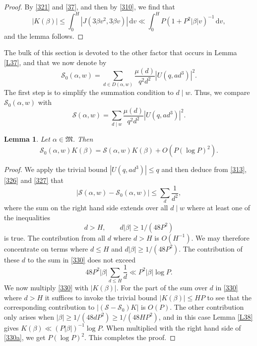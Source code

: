 \documentclass[reqno]{amsart}
\newcommand\dd{{\mathrm d}}
\newtheorem{lemma}[thm]{Lemma}
\numberwithin{equation}{section}
\begin{document}
\begin{proof} By \eqref{321} and \eqref{37}, and then by \eqref{310}, we find that
$$ |K(\beta)| \le \int_0^H|J(3\beta v^2, 3\beta v)|\,\dd v \ll \int_0^H P(1+P^2|\beta|v)^{-1}  \,\dd v, $$
and the lemma follows.
 \end{proof}
 
The bulk of this section is devoted to the other factor that occurs in Lemma \ref{L37}, and that we now denote by 
\begin{equation}\label{326}
\mathscr S_0(\alpha,w) = 
 \sum_{d\in D(\alpha,w)} \frac{\mu(d)}{q^2d^2}
|U(q,ad^3)|^2. \end{equation}
The first step is to simplify the summation condition to $d\mid w$. Thus, we compare $\mathscr S_0(\alpha,w)$ with
\begin{equation}\label{327}
\mathscr S(\alpha,w) = 
 \sum_{d\mid w} \frac{\mu(d)}{q^2d^2}
|U(q,ad^3)|^2. \end{equation}
\begin{lemma}\label{L39}
Let $\alpha\in\mathfrak M$. Then
$$ \mathscr S_0(\alpha,w)K(\beta)= 
\mathscr S(\alpha,w)K(\beta)
+O(P(\log P)^2). $$
\end{lemma}

\begin{proof} We apply the trivial bound $|U(q,ad^3)|\le q$ and then deduce from \eqref{313}, \eqref{326} and \eqref{327} that
\begin{equation}\label{330}
 | \mathscr S(\alpha,w) - \mathscr S_0(\alpha,w) | \le \sum_d \frac1{d^2}, 
\end{equation}
where the sum on the right hand side extends over all $d\mid w$ where at least one of the inequalities
$$ d>H, \qquad d|\beta|\ge 1/(48P^2) $$
is true. The contribution from all $d$ where $d>H$ is $O(H^{-1})$. We may therefore concentrate on terms where $d\le H$ and $d|\beta|\ge 1/(48 P^2)$.
The contribution of these $d$ to the sum in \eqref{330} does not exceed
\begin{equation}\label{330a} 48P^2 |\beta| \sum_{d\le H} \frac1{d} \ll P^2|\beta| \log P. \end{equation}
We now multiply \eqref{330} with $|K(\beta)|$. For the part of the sum over $d$ in \eqref{330} where $d>H$ it suffices to invoke the trivial bound $|K(\beta)|\le HP$ to see that the corresponding contribution to $|(\mathscr S-\mathscr S_0)K|$ is $O(P)$. The other contribution only arises when $|\beta| \ge 1/(48dP^2)
 \ge 1/(48HP^2)$, and in this case Lemma \ref{L38} gives $K(\beta)\ll (P|\beta|)^{-1}\log P$. When multiplied with the right hand side of \eqref{330a}, we get $P(\log P)^2$. This completes the proof.
\end{proof} 
\end{document}
